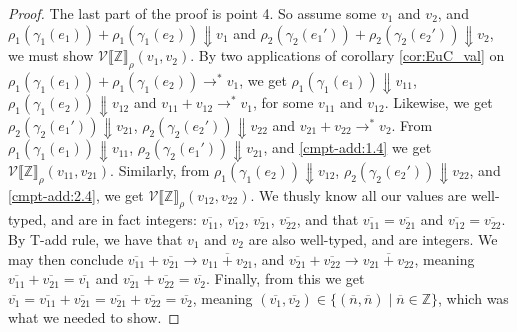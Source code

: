 \documentclass[twoside,11pt,openright]{report}
\theoremstyle{definition}
\newcommand{\expr}{e}
\newcommand{\val}{v}
\newcommand{\Num}[1]{\overline{#1}}
\newcommand{\Tint}{\mathbb{Z}}
\newcommand{\step}{\rightarrow}
\newcommand{\stepS}{\rightarrow^*}
\newcommand{\ValInp}[2]{\mathcal{V} \llbracket #1 \rrbracket_{#2}}
\begin{document}
\begin{proof}
  The last part of the proof is point 4. So assume some $\val_1$ and $\val_2$, and $\rho_1(\gamma_1(\expr_1)) + \rho_1(\gamma_1(\expr_2)) \Downarrow \val_1$ and $\rho_2(\gamma_2(\expr_1')) + \rho_2(\gamma_2(\expr_2')) \Downarrow \val_2$, we must show $\ValInp{\Tint}{\rho}(\val_1, \val_2)$. By two applications of corollary \ref{cor:EuC_val} on $\rho_1(\gamma_1(\expr_1)) + \rho_1(\gamma_1(\expr_2)) \stepS \val_1$, we get $\rho_1(\gamma_1(\expr_1)) \Downarrow \val_{11}$,  $\rho_1(\gamma_1(\expr_2)) \Downarrow \val_{12}$ and $\val_{11} + \val_{12} \stepS \val_1$, for some $\val_{11}$ and $\val_{12}$. Likewise, we get $\rho_2(\gamma_2(\expr_1')) \Downarrow \val_{21}$, $\rho_2(\gamma_2(\expr_2')) \Downarrow \val_{22}$ and $\val_{21} + \val_{22} \stepS \val_2$. From $\rho_1(\gamma_1(\expr_1)) \Downarrow \val_{11}$, $\rho_2(\gamma_2(\expr_1')) \Downarrow \val_{21}$, and \ref*{cmpt-add:1.4} we get $\ValInp{\Tint}{\rho}(\val_{11}, \val_{21})$. Similarly, from $\rho_1(\gamma_1(\expr_2)) \Downarrow \val_{12}$, $\rho_2(\gamma_2(\expr_2')) \Downarrow \val_{22}$, and \ref*{cmpt-add:2.4}, we get $\ValInp{\Tint}{\rho}(\val_{12}, \val_{22})$. We thusly know all our values are well-typed, and are in fact integers: $\Num{\val_{11}}$, $\Num{\val_{12}}$, $\Num{\val_{21}}$, $\Num{\val_{22}}$, and that $\Num{\val_{11}} = \Num{\val_{21}}$ and $\Num{\val_{12}} = \Num{\val_{22}}$. By T-add rule, we have that $\val_1$ and $\val_2$ are also well-typed, and are integers. We may then conclude $\Num{\val_{11}} + \Num{\val_{21}} \step \Num{\val_{11} + \val_{21}}$, and $\Num{\val_{21}} + \Num{\val_{22}} \step \Num{\val_{21} + \val_{22}}$, meaning $\Num{\val_{11}} + \Num{\val_{21}} = \Num{\val_1}$ and $\Num{\val_{21}} + \Num{\val_{22}} = \Num{\val_2}$. Finally, from this we get $\Num{\val_1} = \Num{\val_{11}} + \Num{\val_{21}} = \Num{\val_{21}} + \Num{\val_{22}} = \Num{\val_2}$, meaning $(\Num{\val_1}, \Num{\val_2}) \in \{(\Num{n}, \Num{n}) \mid \Num{n} \in \Tint\}$, which was what we needed to show.
\end{proof}
\end{document}
